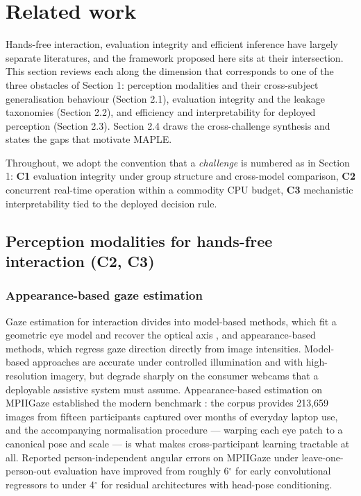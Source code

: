 \FloatBarrier

\section{Related work}

Hands-free interaction, evaluation integrity and efficient inference have largely separate literatures, and the framework proposed here sits at their intersection. This section reviews each along the dimension that corresponds to one of the three obstacles of Section 1: perception modalities and their cross-subject generalisation behaviour (Section 2.1), evaluation integrity and the leakage taxonomies (Section 2.2), and efficiency and interpretability for deployed perception (Section 2.3). Section 2.4 draws the cross-challenge synthesis and states the gaps that motivate MAPLE.

Throughout, we adopt the convention that a \emph{challenge} is numbered as in Section 1: \textbf{C1} evaluation integrity under group structure and cross-model comparison, \textbf{C2} concurrent real-time operation within a commodity CPU budget, \textbf{C3} mechanistic interpretability tied to the deployed decision rule.

\FloatBarrier

\subsection{Perception modalities for hands-free interaction (C2, C3)}

\subsubsection{Appearance-based gaze estimation}

Gaze estimation for interaction  divides into model-based methods, which fit a geometric eye model and recover the optical axis , and appearance-based methods, which regress gaze direction directly from image intensities. Model-based approaches are accurate under controlled illumination and with high-resolution imagery, but degrade sharply on the consumer webcams that a deployable assistive system must assume. Appearance-based estimation on MPIIGaze established the modern benchmark : the corpus provides 213,659 images from fifteen participants captured over months of everyday laptop use, and the accompanying normalisation procedure --- warping each eye patch to a canonical pose and scale --- is what makes cross-participant learning tractable at all. Reported person-independent angular errors on MPIIGaze under leave-one-person-out evaluation have improved from roughly 6$^{\circ}$ for early convolutional regressors to under 4$^{\circ}$ for residual architectures  with head-pose conditioning.

